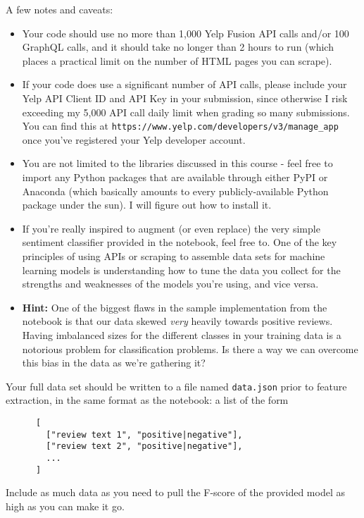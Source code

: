 \documentclass{article}
\begin{document}
A few notes and caveats:
\begin{itemize}
  \item Your code should use no more than 1,000 Yelp Fusion API calls and/or 100 GraphQL calls, and it should take no longer than 2 hours to run (which places a practical limit on the number of HTML pages you can scrape).
  \item If your code does use a significant number of API calls, please include your Yelp API Client ID and API Key in your submission, since otherwise I risk exceeding my 5,000 API call daily limit when grading so many submissions. You can find this at \texttt{https://www.yelp.com/developers/v3/manage\_app} once you've registered your Yelp developer account.
  \item You are not limited to the libraries discussed in this course - feel free to import any Python packages that are available through either PyPI or Anaconda (which basically amounts to every publicly-available Python package under the sun). I will figure out how to install it.
  \item If you're really inspired to augment (or even replace) the very simple sentiment classifier provided in the notebook, feel free to. One of the key principles of using APIs or scraping to assemble data sets for machine learning models is understanding how to tune the data you collect for the strengths and weaknesses of the models you're using, and vice versa.
  \item \textbf{Hint:} One of the biggest flaws in the sample implementation from the notebook is that our data skewed \textit{very} heavily towards positive reviews. Having imbalanced sizes for the different classes in your training data is a notorious problem for classification problems. Is there a way we can overcome this bias in the data as we're gathering it?
\end{itemize}

Your full data set should be written to a file named \texttt{data.json} prior to feature extraction, in the same format as the notebook: a list of the form
\begin{verbatim}
      [
        ["review text 1", "positive|negative"],
        ["review text 2", "positive|negative"],
        ...
      ]
\end{verbatim}

Include as much data as you need to pull the F-score of the provided model as high as you can make it go.
\end{document}
